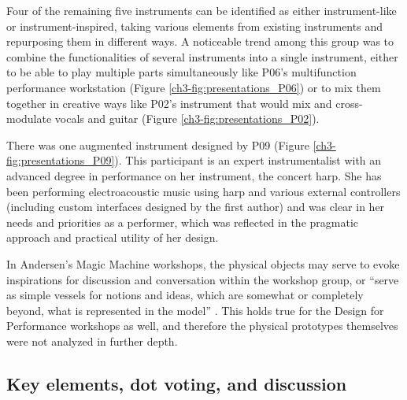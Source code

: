 \documentclass[letterpaper, 12pt]{article}
\begin{document}
Four of the remaining five instruments can be identified as either instrument-like or instrument-inspired, taking various elements from existing instruments and repurposing them in different ways. A noticeable trend among this group was to combine the functionalities of several instruments into a single instrument, either to be able to play multiple parts simultaneously like P06's multifunction performance workstation (Figure \ref{ch3-fig:presentations_P06}) or to mix them together in creative ways like P02's instrument that would mix and cross-modulate vocals and guitar (Figure \ref{ch3-fig:presentations_P02}). 

There was one augmented instrument designed by P09 (Figure \ref{ch3-fig:presentations_P09}). This participant is an expert instrumentalist with an advanced degree in performance on her instrument, the concert harp. She has been performing electroacoustic music using harp and various external controllers (including custom interfaces designed by the first author) and was clear in her needs and priorities as a performer, which was reflected in the pragmatic approach and practical utility of her design. 


In Andersen's Magic Machine workshops, the physical objects may serve to evoke inspirations for discussion and conversation within the workshop group, or ``serve as simple vessels for notions and ideas, which are somewhat or completely beyond, what is represented in the model'' \citep[p. 63]{Andersen2017}. This holds true for the Design for Performance workshops as well, and therefore the physical prototypes themselves were not analyzed in further depth. 

\subsection{Key elements, dot voting, and discussion}
\label{ch3-sec:key-element-identification-and-dot-voting}
\end{document}
